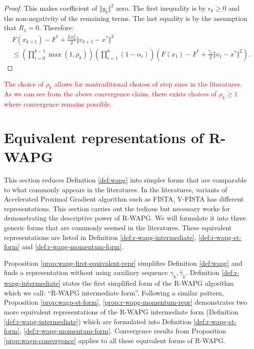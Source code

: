 \documentclass[12pt]{article}
\begin{document}
\begin{proof}
        This makes coefficient of $\Vert g_k\Vert^2$ zero. 
        The first inequality is by $\epsilon_k \ge 0$ and the non-negativity of the remaining terms. 
        The last equality is by the assumption that $R_1 = 0$. 
        Therefore: 
        {\small
        \begin{align*}
            & 
            F(x_{k + 1}) - F^* +
            \frac{L\alpha_k^2}{2}\Vert v_{k + 1} - x^*\Vert^2
            \\
            &\le 
            \left(
                \prod_{i = 0}^{k - 1} \max(1, \rho_{k})
            \right)
            \left(
                \prod_{i = 1}^{k} \left(1  - \alpha_i\right)
            \right)
            \left(
                F(x_1) - F^* + \frac{\gamma_1}{2}\Vert v_1 - x^*\Vert^2
            \right). 
        \end{align*}
        }
    \end{proof}
    \begin{remark}        
        \textcolor{red}
        {
            The choice of $\rho_k$ allows for nontraditional choices of step sizes in the literatures. 
            As we can see from the above convergence claim, there exists choices of $\rho_k\ge 1$ where convergence remains possible. 
        }
    \end{remark}


\section{Equivalent representations of R-WAPG}
    This section reduces Definition \ref{def:wapg} into simpler forms that are comparable to what commonly appears in the literatures. 
    In the literatures, variants of Accelerated Proximal Gradient algorithm such as FISTA, V-FISTA has different representations. 
    This section carries out the tedious but necessary works for demonstrating the descriptive power of R-WAPG. 
    We will formulate it into three generic forms that are commonly seemed in the literatures. 
    These equivalent representations are listed in Definition \ref{def:r-wapg-intermediate}, \ref{def:r-wapg-st-form} and \ref{def:r-wapg-momentum-form}. 
    \par 
    Proposition \ref{prop:wapg-first-equivalent-repr} simplifies Definition \ref{def:wapg} and finds a representation without using auxiliary sequence $\gamma_k, \hat \gamma_k$. 
    Definition \ref{def:r-wapg-intermediate} states the first simplified form of the R-WAPG algorithm which we call: ``R-WAPG intermediate form''. 
    Following a similar pattern, Proposition \ref{prop:wagp-st-form}, \ref{prop:r-wapg-momentum-repr} demonstrates two more equivalent representations of the R-WAPG intermediate form (Definition \ref{def:r-wapg-intermediate}) which are formulated into Definition \ref{def:r-wapg-st-form}, \ref{def:r-wapg-momentum-form}. 
    Convergence results from Proposition \ref{prop:wagp-convergence} applies to all these equivalent forms of R-WAPG. 
    
\end{document}
